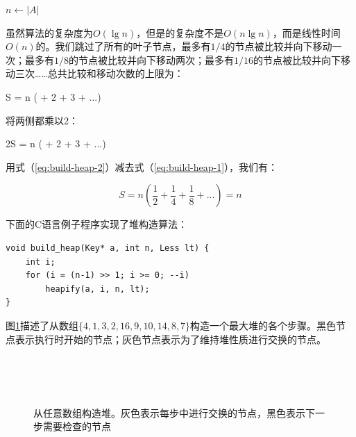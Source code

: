 \documentclass[b5paper]{ctexart}
\begin{document}
\begin{algorithmic}[1]
  \State $n \gets |A|$
    \State {}
  \EndFor
\EndFunction
\end{algorithmic}

虽然算法的复杂度为$O(\lg n)$，但是的复杂度不是$O(n \lg n)$，而是线性时间$O(n)$的。我们跳过了所有的叶子节点，最多有$1/4$的节点被比较并向下移动一次；最多有$1/8$的节点被比较并向下移动两次；最多有$1/16$的节点被比较并向下移动三次……总共比较和移动次数的上限为：

\be
S = n ( + 2  + 3  + ...)
\label{eq:build-heap-1}
\ee

将两侧都乘以2：

\be
2S = n ( + 2  + 3  + ...)
\label{eq:build-heap-2}
\ee

用式（\ref{eq:build-heap-2}）减去式（\ref{eq:build-heap-1}），我们有：

\[
S = n (\frac{1}{2} + \frac{1}{4} + \frac{1}{8} + ...) = n
\]

下面的C语言例子程序实现了堆构造算法：

\lstset{language=C}
\begin{lstlisting}
void build_heap(Key* a, int n, Less lt) {
    int i;
    for (i = (n-1) >> 1; i >= 0; --i)
        heapify(a, i, n, lt);
}
\end{lstlisting}

图\ref{fig:build-heap-3}描述了从数组$\{4, 1, 3, 2, 16, 9, 10, 14, 8, 7\}$构造一个最大堆的各个步骤。黑色节点表示执行时开始的节点；灰色节点表示为了维持堆性质进行交换的节点。

\captionsetup[subfigure]{labelformat=empty, margin=10pt}
\begin{figure}[htbp]
\centering
{} \\
 \\
 \\
\caption{从任意数组构造堆。灰色表示每步中进行交换的节点，黑色表示下一步需要检查的节点} \label{fig:build-heap-3}
\end{figure}
\captionsetup[subfigure]{labelformat=parens}
\end{document}
